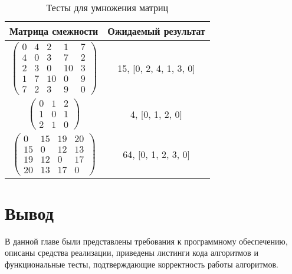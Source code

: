 \begin{table}
	\caption{Тесты для умножения матриц}
	\begin{center}
	\begin{tabular}[c]{|c|c|}
		\hline
		Матрица смежности & Ожидаемый результат \\
		\hline
		$ \begin{pmatrix}
			0 &  4 &  2 &  1 & 7 \\
			4 &  0 &  3 &  7 & 2 \\
			2 &  3 &  0 & 10 & 3 \\
			1 &  7 & 10 &  0 & 9 \\
			7 &  2 &  3 &  9 & 0
		\end{pmatrix}$ &
		15, [0, 2, 4, 1, 3, 0] \\
		
		$ \begin{pmatrix}
			0 & 1 & 2 \\
			1 & 0 & 1 \\
			2 & 1 & 0	
		\end{pmatrix}$ &
		4, [0, 1, 2, 0] \\
		
		$ \begin{pmatrix}
			0 & 15 & 19 & 20 \\
			15 &  0 & 12 & 13 \\
			19 & 12 &  0 & 17 \\
			20 & 13 & 17 &  0
		\end{pmatrix}$ &
		64, [0, 1, 2, 3, 0] \\
		\hline
	\end{tabular}
\end{center}
	\end{table}

\section*{Вывод}

В данной главе были представлены требования к программному обеспечению, описаны средства реализации, приведены листинги кода алгоритмов и функциональные тесты, подтверждающие корректность работы алгоритмов.
